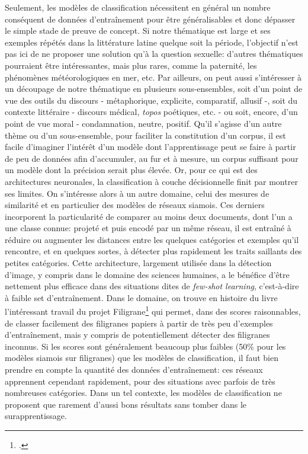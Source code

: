 Seulement, les modèles de classification nécessitent en général un nombre conséquent de données d'entraînement pour être généralisables et donc dépasser le simple stade de preuve de concept. Si notre thématique est large et ses exemples répétés dans la littérature latine quelque soit la période, l'objectif n'est pas ici de ne proposer une solution qu'à la question sexuelle: d'autres thématiques pourraient être intéressantes, mais plus rares, comme la paternité, les phénomènes météorologiques en mer, etc. Par ailleurs, on peut aussi s'intéresser à un découpage de notre thématique en plusieurs sous-ensembles, soit d'un point de vue des outils du discours - métaphorique, explicite, comparatif, allusif -, soit du contexte littéraire - discours médical, \textit{topos} poétiques, etc. - ou soit, encore, d'un point de vue moral - condamnation, neutre, positif. Qu'il s'agisse d'un autre thème ou d'un sous-ensemble, pour faciliter la constitution d'un corpus, il est facile d'imaginer l'intérêt d'un modèle dont l'apprentissage peut se faire à partir de peu de données afin d'accumuler, au fur et à mesure, un corpus suffisant pour un modèle dont la précision serait plus élevée. Or, pour ce qui est des architectures neuronales, la classification à couche décisionnelle finit par montrer ses limites. On s'intéresse alors à un autre domaine, celui des mesures de similarité et en particulier des modèles de réseaux siamois. Ces derniers incorporent la particularité de comparer au moins deux documents, dont l'un a une classe connue: projeté et puis encodé par un même réseau, il est entraîné à réduire ou augmenter les distances entre les quelques catégories et exemples qu'il rencontre, et en quelques sortes, à détecter plus rapidement les traits saillants des petites catégories. Cette architecture, largement utilisée dans la détection d'image, y compris dans le domaine des sciences humaines, a le bénéfice d'être nettement plus efficace dans des situations dites de \textit{few-shot learning}, c'est-à-dire à faible set d'entraînement. Dans le domaine, on trouve en histoire du livre l'intéressant travail du projet Filigrane\footcite{shen_large-scale_2021} qui permet, dans des scores raisonnables, de classer facilement des filigranes papiers à partir de très peu d'exemples d'entraînement, mais y compris de potentiellement détecter des filigranes inconnus. Si les scores sont généralement beaucoup plus faibles (50\% pour les modèles siamois sur filigranes) que les modèles de classification, il faut bien prendre en compte la quantité des données d'entraînement: ces réseaux apprennent cependant rapidement, pour des situations avec parfois de très nombreuses catégories. Dans un tel contexte, les modèles de classification ne proposent que rarement d'aussi bons résultats sans tomber dans le surapprentissage.

